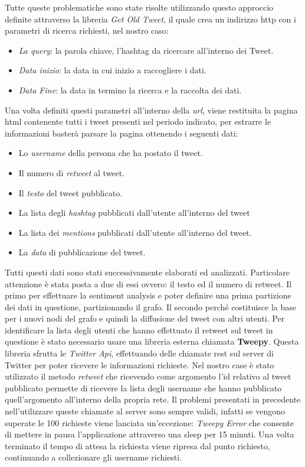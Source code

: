 Tutte queste problematiche sono state risolte utilizzando questo approccio definite attraverso la libreria \textit{Get Old Tweet}, il quale crea un indirizzo http con i parametri di ricerca richiesti, nel nostro caso:
\begin{itemize}
\item \textit{La query}: la parola chiave, l'hashtag da ricercare all'interno dei Tweet.
\item \textit{Data inizio}: la data in cui inizio a raccogliere i dati.
\item \textit{Data Fine}: la data in termino la ricerca e la raccolta dei dati.
\end{itemize}
Una volta definiti questi parametri all'interno della \textit{url}, viene restituita la pagina html contenente tutti i  tweet presenti nel periodo indicato, per estrarre le informazioni basterà parsare la pagina ottenendo i seguenti dati:
\begin{itemize}
\item Lo \textit{username} della persona che ha postato il tweet.
\item Il numero di \textit{retweet} al tweet. 
\item Il \textit{testo} del tweet pubblicato.
\item La lista  degli \textit{hashtag} pubblicati dall'utente all'interno del tweet
\item La lista dei \textit{mentions} pubblicati dall'utente all'interno del tweet.
\item La \textit{data} di pubblicazione del tweet.
\end{itemize}
Tutti questi dati sono stati successivamente elaborati ed analizzati. Particolare attenzione è stata posta a due di essi ovvero: il testo ed il numero di retweet. 
Il primo per effettuare la sentiment analysis e poter definire una prima partizione dei dati in questione, partizionando il grafo.
Il secondo perché costituisce la base per i nuovi nodi del grafo e quindi la diffusione del tweet con altri utenti. 
Per identificare la lista degli utenti che hanno effettuato il retweet sul tweet in questione è stato necessario usare una libreria esterna chiamata \textbf{Tweepy}.
Questa libreria sfrutta le \textit{Twitter Api}, effettuando delle chiamate rest sul server di Twitter per poter ricevere le informazioni richieste. Nel nostro case è stato utilizzato il metodo \textit{retweet} che ricevendo come argomento l'id relativo al tweet pubblicato permette di ricevere la lista degli username che hanno pubblicato quell'argomento all'interno della propria rete. Il problemi presentati in precedente nell'utilizzare queste chiamate al server sono sempre validi, infatti se vengono superate le 100 richieste viene lanciata un'eccezione: \textit{Tweepy Error} che consente di mettere in pausa l'applicazione attraverso una sleep per 15 minuti. Una volta terminato il tempo di attesa la richiesta viene ripresa dal punto richiesto, continuando a collezionare gli username richiesti.

